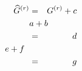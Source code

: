 \documentclass{article}
\begin{document}
\begin{eqnarray}
\lefteqn{\widehat G}\hphantom{G}^{(r)} &=& G^{(r)} + c \\
\lefteqn{a+b} \nonumber \\
&=& d \\
\lefteqn{e+f}\hspace{1cm} \\
&=& g
\end{eqnarray}
\end{document}
